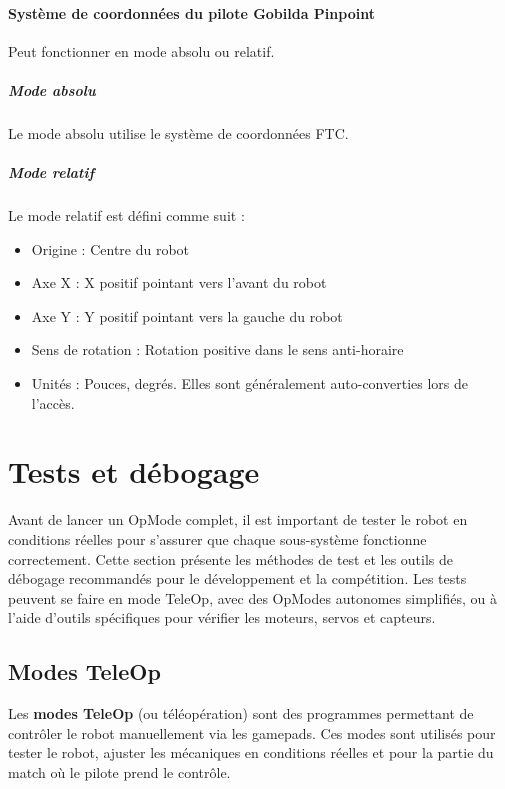 \documentclass[12pt, a4paper]{report}
\begin{document}
    \paragraph{Système de coordonnées du pilote Gobilda Pinpoint}

    Peut fonctionner en mode absolu ou relatif.

    \subparagraph{Mode absolu}

    Le mode absolu utilise le système de coordonnées FTC.

    \subparagraph{Mode relatif}

    Le mode relatif est défini comme suit :

    \begin{itemize}
        \item Origine : Centre du robot
        \item Axe X : X positif pointant vers l'avant du robot
        \item Axe Y : Y positif pointant vers la gauche du robot
        \item Sens de rotation : Rotation positive dans le sens anti-horaire
        \item Unités : Pouces, degrés. Elles sont généralement auto-converties lors de l'accès.
    \end{itemize}


    \section{Tests et débogage}

    Avant de lancer un OpMode complet, il est important de tester le robot en conditions réelles pour s'assurer que chaque sous-système fonctionne correctement. Cette section présente les méthodes de test et les outils de débogage recommandés pour le développement et la compétition. Les tests peuvent se faire en mode TeleOp, avec des OpModes autonomes simplifiés, ou à l'aide d'outils spécifiques pour vérifier les moteurs, servos et capteurs.


    \subsection{Modes TeleOp}


    Les \textbf{modes TeleOp} (ou téléopération) sont des programmes permettant de contrôler le robot manuellement via les gamepads. Ces modes sont utilisés pour tester le robot, ajuster les mécaniques en conditions réelles et pour la partie du match où le pilote prend le contrôle.
\end{document}
